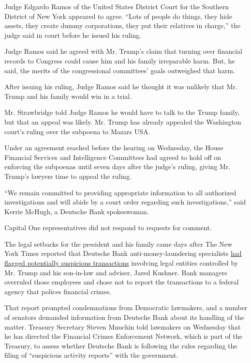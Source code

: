 Judge Edgardo Ramos of the United States District Court for the Southern
District of New York appeared to agree. ``Lots of people do things, they
hide assets, they create dummy corporations, they put their relatives in
charge,'' the judge said in court before he issued his ruling.

Judge Ramos said he agreed with Mr. Trump's claim that turning over
financial records to Congress could cause him and his family irreparable
harm. But, he said, the merits of the congressional committees' goals
outweighed that harm.

After issuing his ruling, Judge Ramos said he thought it was unlikely
that Mr. Trump and his family would win in a trial.

Mr. Strawbridge told Judge Ramos he would have to talk to the Trump
family, but that an appeal was likely. Mr. Trump has already appealed
the Washington court's ruling over the subpoena to Mazars USA.

Under an agreement reached before the hearing on Wednesday, the House
Financial Services and Intelligence Committees had agreed to hold off on
enforcing the subpoenas until seven days after the judge's ruling,
giving Mr. Trump's lawyers time to appeal the ruling.

``We remain committed to providing appropriate information to all
authorized investigations and will abide by a court order regarding such
investigations,'' said Kerrie McHugh, a Deutsche Bank spokeswoman.

Capital One representatives did not respond to requests for comment.

The legal setbacks for the president and his family came days after The
New York Times reported that Deutsche Bank anti-money-laundering
specialists
\href{https://www.nytimes3xbfgragh.onion/2019/05/19/business/deutsche-bank-trump-kushner.html}{had
flagged potentially suspicious transactions} involving legal entities
controlled by Mr. Trump and his son-in-law and adviser, Jared Kushner.
Bank managers overruled those employees and chose not to report the
transactions to a federal agency that polices financial crimes.

That report prompted condemnations from Democratic lawmakers, and a
number of senators demanded information from Deutsche Bank about its
handling of the matter. Treasury Secretary Steven Mnuchin told lawmakers
on Wednesday that he has directed the Financial Crimes Enforcement
Network, which is part of the Treasury, to assess whether Deutsche Bank
is following the rules regarding the filing of ``suspicious activity
reports'' with the government.

